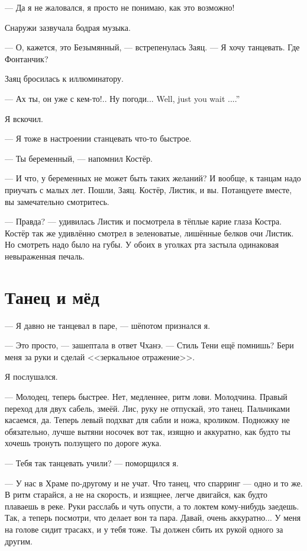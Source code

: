 --- Да я не жаловался, я просто не понимаю, как это возможно!

Снаружи зазвучала бодрая музыка.

--- О, кажется, это Безымянный, --- встрепенулась Заяц.
--- Я хочу танцевать.
Где Фонтанчик?

Заяц бросилась к иллюминатору.

--- Ах ты, он уже с кем-то!..
{Ну погоди...}
{Well, just you wait ....''}

Я вскочил.

--- Я тоже в настроении станцевать что-то быстрое.

--- Ты беременный, --- напомнил Костёр.

--- И что, у беременных не может быть таких желаний?
И вообще, к танцам надо приучать с малых лет.
Пошли, Заяц.
Костёр, Листик, и вы.
Потанцуете вместе, вы замечательно смотритесь.

--- Правда? --- удивилась Листик и посмотрела в тёплые карие глаза Костра.
Костёр так же удивлённо смотрел в зеленоватые, лишённые белков очи Листик.
Но смотреть надо было на губы.
У обоих в уголках рта застыла одинаковая невыраженная печаль.

\section{Танец и мёд}

--- Я давно не танцевал в паре, --- шёпотом признался я.

--- Это просто, --- зашептала в ответ Чханэ.
--- Стиль Тени ещё помнишь?
Бери меня за руки и сделай <<зеркальное отражение>>.

Я послушался.

--- Молодец, теперь быстрее.
Нет, медленнее, ритм лови.
Молодчина.
Правый переход для двух сабель, змеёй.
Лис, руку не отпускай, это танец.
Пальчиками касаемся, да.
Теперь левый подхват для сабли и ножа, кроликом.
Подножку не обязательно, лучше вытяни носочек вот так, изящно и аккуратно, как будто ты хочешь тронуть ползущего по дороге жука.

--- Тебя так танцевать учили? --- поморщился я.

--- У нас в Храме по-другому и не учат.
Что танец, что спарринг --- одно и то же.
В ритм старайся, а не на скорость, и изящнее, легче двигайся, как будто плаваешь в реке.
Руки расслабь и чуть опусти, а то локтем кому-нибудь заедешь.
Так, а теперь посмотри, что делает вон та пара.
Давай, очень аккуратно...
У меня на голове сидит трасакх, и у тебя тоже.
Ты должен сбить их рукой одного за другим.

